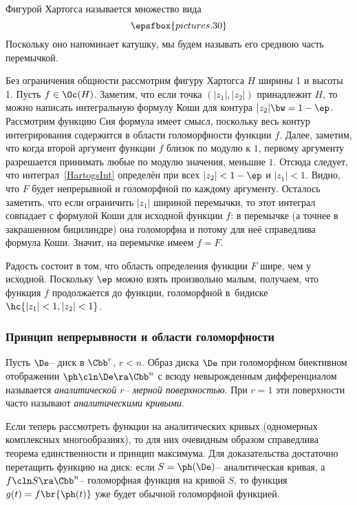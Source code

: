 \documentclass[a4paper]{article}
\begin{document}
Фигурой Хартогса называется множество вида
$$\epsfbox{pictures.30}$$
Поскольку оно напоминает катушку, мы будем называть его среднюю часть перемычкой.

Без ограничения общности рассмотрим фигуру Хартогса $H$ ширины 1 и высоты 1. Пусть $f \in \Oc(H)$.
Заметим, что если точка $(|z_1|,|z_2|)$ принадлежит $H$, то можно написать интегральную формулу Коши для
контура $|z_2| \bw= 1-\ep$. Рассмотрим функцию
Сия формула имеет смысл, поскольку весь контур интегрирования содержится в области голоморфности функции $f$.
Далее, заметим, что когда второй аргумент функции $f$ близок по модулю к $1$, первому аргументу разрешается
принимать любые по модулю значения, меньшие $1$. Отсюда следует, что интеграл~\eqref{HartogsInt} определён
при всех $|z_2| < 1 - \ep$ и $|z_1| < 1$. Видно, что $F$ будет непрерывной и голоморфной по каждому аргументу.
Осталось заметить, что если ограничить $|z_1|$ шириной перемычки,
то этот интеграл совпадает с формулой Коши для исходной функции $f$: в перемычке (а точнее в
закрашенном бицилиндре) она голоморфна и потому для неё справедлива формула Коши. Значит, на
перемычке имеем $f = F$.

Радость состоит в том, что область определения функции $F$ шире, чем у исходной. Поскольку $\ep$ можно взять
произвольно малым, получаем, что функция $f$ продолжается до функции, голоморфной в~бидиске
$\hc{|z_1| < 1, |z_2| < 1}$.

\subsubsection{Принцип непрерывности и области голоморфности}

\begin{df}
Пусть $\De$-- диск в $\Cbb^r$, $r < n$. Образ диска $\De$ при голоморфном биективном
отображении $\ph\cln \De \ra \Cbb^n$ с всюду невырожденным дифференциалом называется
\emph{аналитической $r$-- мерной поверхностью}. При $r=1$ эти поверхности
часто называют \emph{аналитическими кривыми}.
\end{df}

Если теперь рассмотреть функции на аналитических кривых (одномерных комплексных многообразиях),
то для них очевидным образом справедлива теорема единственности
и принцип максимума. Для доказательства достаточно перетащить функцию на диск:
если $S = \ph(\De)$-- аналитическая кривая, а $f\cln S\ra \Cbb^n$-- голоморфная функция
на кривой $S$, то функция $g(t) = f\br{\ph(t)}$ уже будет обычной голоморфной функцией.
\end{document}
